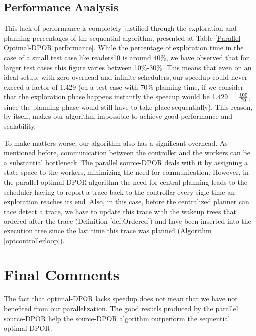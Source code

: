 


\subsection{Performance Analysis}

This lack of performance is completely justified through the exploration and planning percentages of the sequential algorithm,
presented at Table \ref{Parallel Optimal-DPOR performance}. While the percentage of exploration time in the case of a small test
case like readers10 is around 40$\%$, we have observed that for larger test cases this figure varies between 10$\%$-30$\%$. 
This means that even on an ideal setup, with zero overhead and infinite schedulers, our speedup could never exceed a factor
of 1.429 (on a test case with 70$\%$ planning time, if we consider that the exploration phase happens instantly the 
speedup would be 1.429 = $100\over 70$, since the planning phase would still have to take place sequentially). 
This reason, by itself, makes our algorithm impossible to achieve good performance and scalability.

To make matters worse, our algorithm also has a significant overhead. As mentioned before, communication between
the controller and the workers can be a substantial bottleneck. The parallel source-DPOR deals with it by assigning
a state space to the workers, minimizing the need for communication. However, in the parallel optimal-DPOR algorithm
the need for central planning leads to the scheduler having to report a trace back to the controller every sigle
time an exploration reaches its end. Also, in this case, before the centralized planner can race detect a trace,
we have to update this trace with the wakeup trees that ordered after the trace
(Definition \ref{def:Ordered}) and have been inserted into the execution tree
since the last time this trace was planned (Algorithm \ref{optcontrollerloop}).

\section{Final Comments}

The fact that optimal-DPOR lacks speedup does not mean that we have not benefited from our parallelization. 
The good resutls produced by the parallel source-DPOR help the source-DPOR algorithm outperform the sequential optimal-DPOR.

